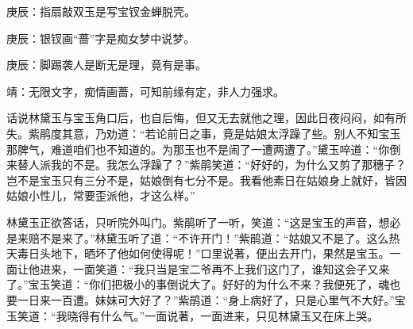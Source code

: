 

\begin{parag}
    \begin{note}庚辰：指扇敲双玉是写宝钗金蝉脱壳。\end{note}
\end{parag}


\begin{parag}
    \begin{note}庚辰：银钗画“蔷”字是痴女梦中说梦。\end{note}
\end{parag}


\begin{parag}
    \begin{note}庚辰：脚踢袭人是断无是理，竟有是事。\end{note}
\end{parag}


\begin{parag}
    \begin{note}靖：无限文字，痴情画蔷，可知前缘有定，非人力强求。\end{note}
\end{parag}


\begin{parag}
    话说林黛玉与宝玉角口后，也自后悔，但又无去就他之理，因此日夜闷闷，如有所失。紫鹃度其意，乃劝道：“若论前日之事，竟是姑娘太浮躁了些。别人不知宝玉那脾气，难道咱们也不知道的。为那玉也不是闹了一遭两遭了。”黛玉啐道：“你倒来替人派我的不是。我怎么浮躁了？”紫鹃笑道：“好好的，为什么又剪了那穗子？岂不是宝玉只有三分不是，姑娘倒有七分不是。我看他素日在姑娘身上就好，皆因姑娘小性儿，常要歪派他，才这么样。”
\end{parag}


\begin{parag}
    林黛玉正欲答话，只听院外叫门。紫鹃听了一听，笑道：“这是宝玉的声音，想必是来赔不是来了。”林黛玉听了道：“不许开门！”紫鹃道：“姑娘又不是了。这么热天毒日头地下，晒坏了他如何使得呢！”口里说著，便出去开门，果然是宝玉。一面让他进来，一面笑道：“我只当是宝二爷再不上我们这门了，谁知这会子又来了。”宝玉笑道：“你们把极小的事倒说大了。好好的为什么不来？我便死了，魂也要一日来一百遭。妹妹可大好了？”紫鹃道：“身上病好了，只是心里气不大好。”宝玉笑道：“我晓得有什么气。”一面说著，一面进来，只见林黛玉又在床上哭。
\end{parag}


